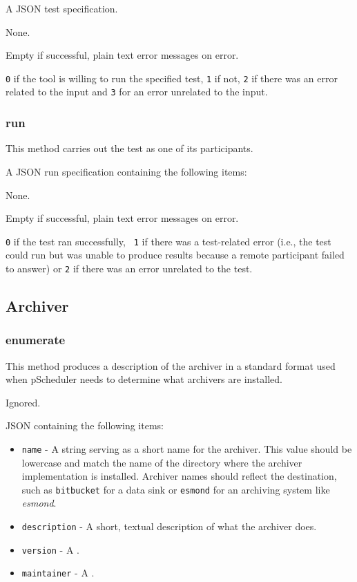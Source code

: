 \documentclass[10pt,titlepage]{article}
\begin{document}
 A JSON test specification.

 None.

 Empty if successful, plain text error
messages on error.

 {\tt 0} if the tool is willing to run the
specified test, {\tt 1} if not, {\tt 2} if there was an error related
to the input and {\tt 3} for an error unrelated to the input.


\subsubsection{run}
This method carries out the test as one of its participants.

 A JSON run specification containing the following items:

 None.

 Empty if successful, plain text error
messages on error.

 {\tt 0} if the test ran successfully, {\tt
  1} if there was a test-related error (i.e., the test could run but
was unable to produce results because a remote participant failed to
answer) or {\tt 2} if there was an error unrelated to the test.



%
%
\subsection{Archiver}

\subsubsection{enumerate}

This method produces a description of the archiver in a standard
format used when pScheduler needs to determine what archivers are
installed.

 Ignored.

 JSON containing the following items:
\begin{itemize}
\item{\tt name} - A string serving as a short name for the archiver.
  This value should be lowercase and match the name of the directory
  where the archiver implementation is installed.  Archiver names
  should reflect the destination, such as {\tt bitbucket} for a data
  sink or {\tt esmond} for an archiving system like {\it esmond}.
\item{\tt description} - A short, textual description of what the
  archiver does.
\item{\tt version} - A .
\item{\tt maintainer} - A .
\end{itemize}
\end{document}
